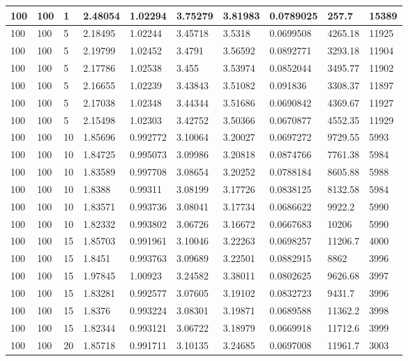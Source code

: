 \begin{landscape}
\begin{longtable}{ | l | l | l | l | l | l | l | l | l | l | }
100 & 100 & 1 & 2.48054 & 1.02294 & 3.75279 & 3.81983 & 0.0789025 & 257.7 & 15389\\ \hline
100 & 100 & 5 & 2.18495 & 1.02244 & 3.45718 & 3.5318 & 0.0699508 & 4265.18 & 11925\\ \hline
100 & 100 & 5 & 2.19799 & 1.02452 & 3.4791 & 3.56592 & 0.0892771 & 3293.18 & 11904\\ \hline
100 & 100 & 5 & 2.17786 & 1.02538 & 3.455 & 3.53974 & 0.0852044 & 3495.77 & 11902\\ \hline
100 & 100 & 5 & 2.16655 & 1.02239 & 3.43843 & 3.51082 & 0.091836 & 3308.37 & 11897\\ \hline
100 & 100 & 5 & 2.17038 & 1.02348 & 3.44344 & 3.51686 & 0.0690842 & 4369.67 & 11927\\ \hline
100 & 100 & 5 & 2.15498 & 1.02303 & 3.42752 & 3.50366 & 0.0670877 & 4552.35 & 11929\\ \hline
100 & 100 & 10 & 1.85696 & 0.992772 & 3.10064 & 3.20027 & 0.0697272 & 9729.55 & 5993\\ \hline
100 & 100 & 10 & 1.84725 & 0.995073 & 3.09986 & 3.20818 & 0.0874766 & 7761.38 & 5984\\ \hline
100 & 100 & 10 & 1.83589 & 0.997708 & 3.08654 & 3.20252 & 0.0788184 & 8605.88 & 5988\\ \hline
100 & 100 & 10 & 1.8388 & 0.99311 & 3.08199 & 3.17726 & 0.0838125 & 8132.58 & 5984\\ \hline
100 & 100 & 10 & 1.83571 & 0.993736 & 3.08041 & 3.17734 & 0.0686622 & 9922.2 & 5990\\ \hline
100 & 100 & 10 & 1.82332 & 0.993802 & 3.06726 & 3.16672 & 0.0667683 & 10206 & 5990\\ \hline
100 & 100 & 15 & 1.85703 & 0.991961 & 3.10046 & 3.22263 & 0.0698257 & 11206.7 & 4000\\ \hline
100 & 100 & 15 & 1.8451 & 0.993763 & 3.09689 & 3.22501 & 0.0882915 & 8862 & 3996\\ \hline
100 & 100 & 15 & 1.97845 & 1.00923 & 3.24582 & 3.38011 & 0.0802625 & 9626.68 & 3997\\ \hline
100 & 100 & 15 & 1.83281 & 0.992577 & 3.07605 & 3.19102 & 0.0832723 & 9431.7 & 3996\\ \hline
100 & 100 & 15 & 1.8376 & 0.993224 & 3.08301 & 3.19871 & 0.0689588 & 11362.2 & 3998\\ \hline
100 & 100 & 15 & 1.82344 & 0.993121 & 3.06722 & 3.18979 & 0.0669918 & 11712.6 & 3999\\ \hline
100 & 100 & 20 & 1.85718 & 0.991711 & 3.10135 & 3.24685 & 0.0697008 & 11961.7 & 3003\\ \hline

\end{longtable}
\end{landscape}
